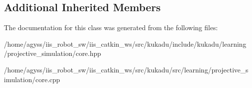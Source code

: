 \subsection*{Additional Inherited Members}


The documentation for this class was generated from the following files\+:\begin{DoxyCompactItemize}
\item 
/home/agyss/iis\+\_\+robot\+\_\+sw/iis\+\_\+catkin\+\_\+ws/src/kukadu/include/kukadu/learning/projective\+\_\+simulation/core.\+hpp\item 
/home/agyss/iis\+\_\+robot\+\_\+sw/iis\+\_\+catkin\+\_\+ws/src/kukadu/src/learning/projective\+\_\+simulation/core.\+cpp\end{DoxyCompactItemize}
